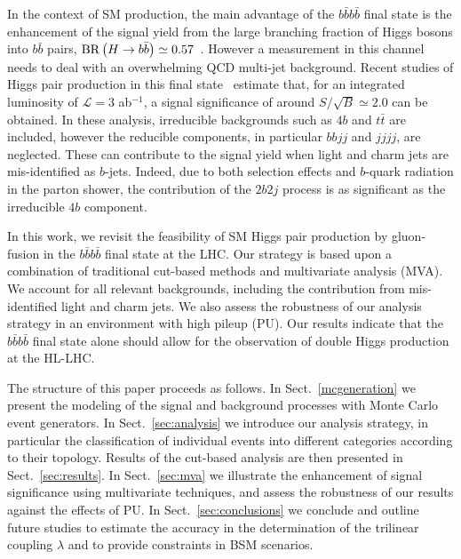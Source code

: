 In the context of SM production,
the main advantage of the $b\bar{b}b\bar{b}$ final state is the
enhancement of the signal yield
from the large branching fraction of Higgs bosons into
$b\bar{b}$
pairs, ${\rm BR}\left( H\to b\bar{b}\right)\simeq 0.57$~\cite{Dittmaier:2012vm}.
%
However a measurement in this channel
needs to deal with an overwhelming QCD multi-jet background.
%
Recent studies of Higgs pair production in this
final state~\cite{Wardrope:2014kya,deLima:2014dta}
estimate that, for an integrated
luminosity of
$\mathcal{L}=3$ ab$^{-1}$,
a signal significance of around $S/\sqrt{B}\simeq 2.0$ can be obtained.
%
In these analysis, irreducible backgrounds such as $4b$ and
$t\bar{t}$ are included, however the
reducible components, in particular $bbjj$ and
$jjjj$, are neglected.
%
These can contribute to the signal yield when 
light and charm jets are mis-identified as $b$-jets.
%
Indeed, due to both
selection effects and $b$-quark radiation in the
parton shower, the
contribution of the $2b2j$ process is as significant as
the irreducible $4b$ component.

In this work, we revisit the feasibility of SM Higgs pair production by
gluon-fusion
in the $b\bar{b}b\bar{b}$ final state at the LHC.
%
 Our strategy is based upon a combination of traditional cut-based
 methods and multivariate analysis (MVA).
  We account for  all relevant
  backgrounds, including the contribution from mis-identified
  light and charm jets.
  We also assess the robustness of our analysis strategy in
  an environment with high pileup (PU).
 Our results indicate that 
  the $b\bar{b}b\bar{b}$ 
final state
alone should allow for the observation of double Higgs production
  at the HL-LHC.
    
The structure of this paper proceeds as follows.
%
In Sect.~\ref{mcgeneration} we present the modeling of the signal
and background processes with Monte Carlo event generators.
%
In Sect.~\ref{sec:analysis}
we introduce our analysis strategy, in particular
the classification of individual events into
different categories according to their topology.
%
Results of the cut-based analysis
are then presented in Sect.~\ref{sec:results}.
%
In Sect.~\ref{sec:mva} we illustrate the enhancement of signal
significance using multivariate techniques, and
assess the robustness of our results against the effects of PU.
%
In Sect.~\ref{sec:conclusions} we conclude and outline
future studies to estimate the accuracy
in the determination of the trilinear coupling $\lambda$ and
to provide
 constraints in
BSM scenarios.

